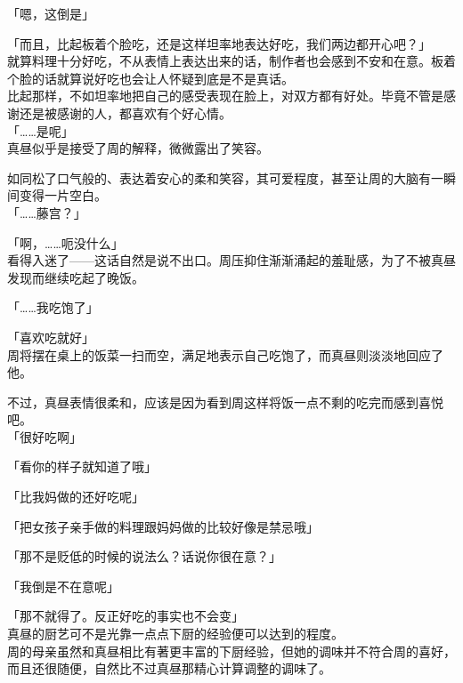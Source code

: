 「嗯，这倒是」

「而且，比起板着个脸吃，还是这样坦率地表达好吃，我们两边都开心吧？」\\

就算料理十分好吃，不从表情上表达出来的话，制作者也会感到不安和在意。板着个脸的话就算说好吃也会让人怀疑到底是不是真话。\\

比起那样，不如坦率地把自己的感受表现在脸上，对双方都有好处。毕竟不管是感谢还是被感谢的人，都喜欢有个好心情。\\

「……是呢」\\

真昼似乎是接受了周的解释，微微露出了笑容。

如同松了口气般的、表达着安心的柔和笑容，其可爱程度，甚至让周的大脑有一瞬间变得一片空白。\\

「……藤宫？」

「啊，……呃没什么」\\

看得入迷了——这话自然是说不出口。周压抑住渐渐涌起的羞耻感，为了不被真昼发现而继续吃起了晚饭。\\

\vspace{2\baselineskip}

「……我吃饱了」

「喜欢吃就好」\\%

周将摆在桌上的饭菜一扫而空，满足地表示自己吃饱了，而真昼则淡淡地回应了他。

不过，真昼表情很柔和，应该是因为看到周这样将饭一点不剩的吃完而感到喜悦吧。\\

「很好吃啊」

「看你的样子就知道了哦」

「比我妈做的还好吃呢」

「把女孩子亲手做的料理跟妈妈做的比较好像是禁忌哦」

「那不是贬低的时候的说法么？话说你很在意？」

「我倒是不在意呢」

「那不就得了。反正好吃的事实也不会变」\\

真昼的厨艺可不是光靠一点点下厨的经验便可以达到的程度。\\

周的母亲虽然和真昼相比有著更丰富的下厨经验，但她的调味并不符合周的喜好，而且还很随便，自然比不过真昼那精心计算调整的调味了。\\%

